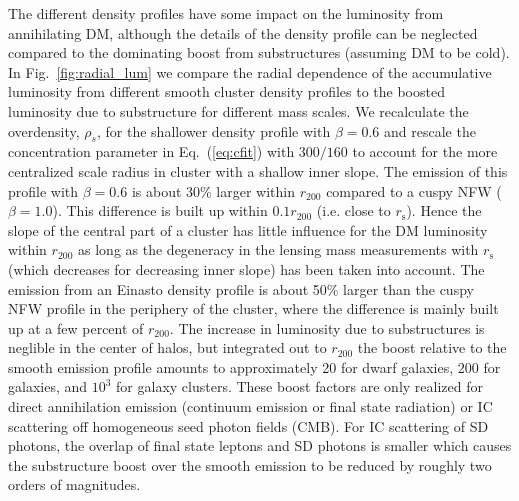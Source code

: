 \documentclass[10pt,aps,pra,reprint,amsmath,amsfonts,amssymb,showpacs,nofootinbib,floatfix]{revtex4-1}
\newcommand{\rmn}{\mathrm}
\newcommand{\s}{\rmn{s}}
\newcommand{\rhos}{\ensuremath{\rho_s}}
\newcommand{\rvir}{r_{200}}
\begin{document}
The different density profiles have some impact on the luminosity from
annihilating DM, although the details of the density profile can be
neglected compared to the dominating boost from substructures
(assuming DM to be cold). In Fig.~\ref{fig:radial_lum} we compare the
radial dependence of the accumulative luminosity from different smooth
cluster density profiles to the boosted luminosity due to substructure
for different mass scales. We recalculate the overdensity, $\rhos$,
for the shallower density profile with $\beta=0.6$ and rescale the
concentration parameter in Eq.~(\ref{eq:cfit}) with $300/160$
\cite{2011ApJ...728L..39N} to account for the more centralized scale
radius in cluster with a shallow inner slope. The emission of this
profile with $\beta=0.6$ is about 30\% larger within $\rvir$ compared
to a cuspy NFW ($\beta=1.0$).  This difference is built up within
$0.1\rvir$ (i.e. close to $r_\s$). Hence the slope of the central part
of a cluster has little influence for the DM luminosity within $\rvir$
as long as the degeneracy in the lensing mass measurements with $r_\s$
(which decreases for decreasing inner slope) has been taken into
account. The emission from an Einasto density profile is about 50\%
larger than the cuspy NFW profile in the periphery of the cluster,
where the difference is mainly built up at a few percent of
$\rvir$. The increase in luminosity due to substructures is neglible
in the center of halos, but integrated out to $\rvir$ the boost
relative to the smooth emission profile amounts to approximately 20
for dwarf galaxies, $200$ for galaxies, and $10^3$ for galaxy
clusters. These boost factors are only realized for direct
annihilation emission (continuum emission or final state radiation) or
IC scattering off homogeneous seed photon fields (CMB). For IC
scattering of SD photons, the overlap of final state leptons and SD
photons is smaller which causes the substructure boost over the smooth
emission to be reduced by roughly two orders of magnitudes.
\end{document}
